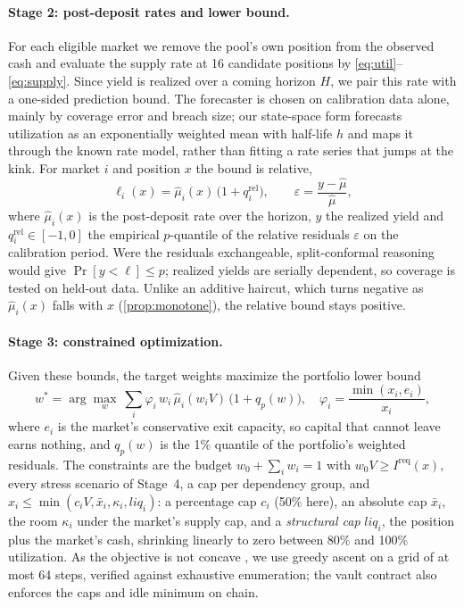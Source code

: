 \documentclass[sigconf]{acmart}
\begin{document}
\paragraph{Stage 2: post-deposit rates and lower bound.}
For each eligible market we remove the pool's own position from the observed cash and evaluate the supply rate at 16 candidate positions by \eqref{eq:util}--\eqref{eq:supply}. Since yield is realized over a coming horizon $H$, we pair this rate with a one-sided prediction bound. The forecaster is chosen on calibration data alone, mainly by coverage error and breach size; our state-space form forecasts utilization as an exponentially weighted mean with half-life $h$ and maps it through the known rate model, rather than fitting a rate series that jumps at the kink. For market $i$ and position $x$ the bound is relative,
\begin{equation}
  \ell_i(x) = \hat\mu_i(x)\,\bigl(1 + q^{\mathrm{rel}}_i\bigr), \qquad \varepsilon = \frac{y - \hat\mu}{\hat\mu},
  \label{eq:lowerbound}
\end{equation}
where $\hat\mu_i(x)$ is the post-deposit rate over the horizon, $y$ the realized yield and $q^{\mathrm{rel}}_i \in [-1, 0]$ the empirical $p$-quantile of the relative residuals $\varepsilon$ on the calibration period. Were the residuals exchangeable, split-conformal reasoning would give $\Pr[y < \ell] \le p$; realized yields are serially dependent, so coverage is tested on held-out data. Unlike an additive haircut, which turns negative as $\hat\mu_i(x)$ falls with $x$ (\cref{prop:monotone}), the relative bound stays positive.

\paragraph{Stage 3: constrained optimization.}
Given these bounds, the target weights maximize the portfolio lower bound
\begin{equation}
  w^{*} = \arg\max_{w}\ \sum_{i} \varphi_i\, w_i\, \hat\mu_i(w_i V)\,\bigl(1 + q_p(w)\bigr), \quad
  \varphi_i = \frac{\min(x_i, e_i)}{x_i},
  \label{eq:objective}
\end{equation}
where $e_i$ is the market's conservative exit capacity, so capital that cannot leave earns nothing, and $q_p(w)$ is the 1\% quantile of the portfolio's weighted residuals. The constraints are the budget $w_0 + \sum_i w_i = 1$ with $w_0 V \ge I^{\mathrm{req}}(x)$, every stress scenario of Stage~4, a cap per dependency group, and $x_i \le \min(c_i V, \bar{x}_i, \kappa_i, \mathit{liq}_i)$: a percentage cap $c_i$ (50\% here), an absolute cap $\bar{x}_i$, the room $\kappa_i$ under the market's supply cap, and a \emph{structural cap} $\mathit{liq}_i$, the position plus the market's cash, shrinking linearly to zero between 80\% and 100\% utilization. As the objective is not concave \citep{baude2026capital}, we use greedy ascent on a grid of at most 64 steps, verified against exhaustive enumeration; the vault contract also enforces the caps and idle minimum on chain.
\end{document}

